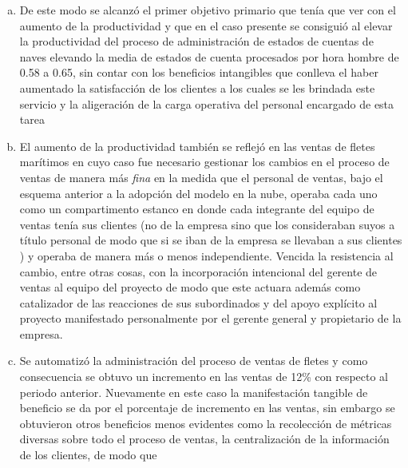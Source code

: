 \begin{enumerate}[a.]
          mismos interesados sin que mediara \emph{un equipo de expertos de TI},
          con la posibilidad adem\'as de usar un periodo de prueba gratuito,
          usualmente de un mes, otorgado por los proveedores
    \item De este modo se alcanz\'o el primer objetivo primario que ten\'ia que
          ver con el aumento de la productividad y que en el caso presente se
          consigui\'o al elevar la productividad del proceso de administraci\'on
          de estados de cuentas de naves elevando la media de estados de cuenta
          procesados por hora hombre de 0.58 a 0.65, sin contar con los beneficios
          intangibles que conlleva el haber aumentado la satisfacci\'on de los
          clientes a los cuales se les brindada este servicio y la aligeraci\'on
          de la carga operativa del personal encargado de esta tarea
    \item El aumento de la productividad tambi\'en se reflej\'o en las ventas de
          fletes mar\'itimos en cuyo caso fue necesario gestionar los cambios en
          el proceso de ventas de manera m\'as \emph{fina} en la medida que el personal
          de ventas, bajo el esquema anterior a la adopci\'on del modelo en la
          nube, operaba cada uno como un compartimento estanco en donde cada
          integrante del equipo de ventas ten\'ia sus clientes (no de la empresa
          sino que los consideraban suyos a t\'itulo personal de modo que si se
          iban de la empresa se llevaban a sus clientes ) y operaba de manera
          m\'as o menos independiente. Vencida la resistencia al cambio, entre
          otras cosas, con la incorporaci\'on intencional del gerente de ventas
          al equipo del proyecto de modo que este actuara adem\'as como catalizador
          de las reacciones de sus subordinados y del apoyo expl\'icito al
          proyecto manifestado personalmente por el gerente general y propietario
          de la empresa.
    \item Se automatiz\'o la administraci\'on del proceso de ventas de fletes y
          como consecuencia se obtuvo un incremento en las ventas de 12\% con
          respecto al periodo anterior. Nuevamente en este caso la manifestaci\'on
          tangible de beneficio se da por el porcentaje de incremento en las ventas,
          sin embargo se obtuvieron otros beneficios menos evidentes como la
          recolecci\'on de m\'etricas diversas sobre todo el proceso de ventas,
          la centralizaci\'on de la informaci\'on de los clientes, de modo que

\end{enumerate}
